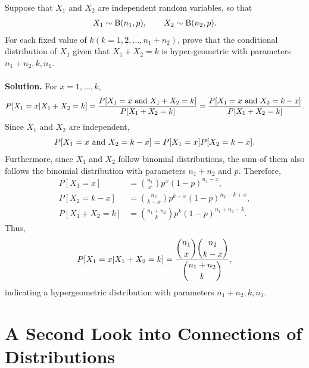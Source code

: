 Suppose that $X_1$ and $X_2$ are independent random variables, so that
\begin{align*}
X_1\sim \mathrm{B}(n_1, p), \qquad X_2\sim \mathrm{B}(n_2, p).
\end{align*}
For each fixed value of $k (k = 1, 2,\ldots, n_1 + n_2)$, prove that the conditional distribution of $X_1$ given that $X_1 + X_2 = k$ is hyper-geometric with parameters $n_1 + n_2, k, n_1$. \\
~\\
\textbf{Solution.} For $x = 1, \ldots, k$, 
\begin{align*}
P[X_1 = x|X_1 + X_2 = k] = \frac{P[X_1 = x \mathrm{\ and\ } X_1 + X_2 = k]}{P[X_1 + X_2 = k]} = \frac{P[X_1 = x \mathrm{\ and\ } X_2 = k - x]}{P[X_1 + X_2 = k]}.
\end{align*}
Since $X_1$ and $X_2$ are independent,
\begin{align*}
P[X_1 = x \mathrm{\ and\ } X_2 = k - x] = P[X_1 = x]P[X_2 = k - x].
\end{align*}
Furthermore, since $X_1$ and $X_2$ follow binomial distributions, the sum of them also follows the binomial distribution with parameters $n_1 + n_2$ and $p$. Therefore,
\begin{align*}
P[X_1 = x] & = \binom{n_1}{x} p^x(1-p)^{n_1-x}, \\
P[X_2 = k - x] & = \binom{n_2}{k-x} p^{k-x} (1-p)^{n_2-k+x}, \\
P[X_1 + X_2 = k] & = \binom{n_1 + n_2}{k} p^k(1-p)^{n_1+n_2-k}.
\end{align*}
Thus,
\begin{align*}
P[X_1 = x|X_1 + X_2 = k] = \frac{\dbinom{n_1}{x}\dbinom{n_2}{k-x}}{\dbinom{n_1+n_2}{k}},
\end{align*}
indicating a hypergeometric distribution with parameters $n_1+n_2, k, n_1$.


\section*{A Second Look into Connections of Distributions}

